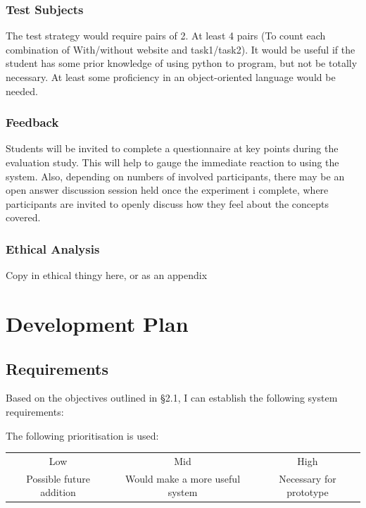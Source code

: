 \documentclass[a4paper,11pt]{report}
\begin{document}
\subsection{Test Subjects}
The test strategy would require pairs of 2. At least 4 pairs (To count each combination of With/without website and task1/task2). It would be useful if the student has some prior knowledge of using python to program, but not be totally necessary. At least some proficiency in an object-oriented language would be needed.

\subsection{Feedback}
Students will be invited to complete a questionnaire at key points during the evaluation study. This will help to gauge the immediate reaction to using the system. Also, depending on numbers of involved participants, there may be an open answer discussion session held once the experiment i complete, where participants are invited to openly discuss how they feel about the concepts covered.

\subsection{Ethical Analysis}
Copy in ethical thingy here, or as an appendix



\chapter{Development Plan}

\section{Requirements}
Based on the objectives outlined in \S 2.1, I can establish the following system requirements:\par
The following prioritisation is used:\\
\begin{tabular}{ccc}
 Low & Mid & High\\
 Possible future addition & Would make a more useful system & Necessary for prototype
\end{tabular}
\end{document}
